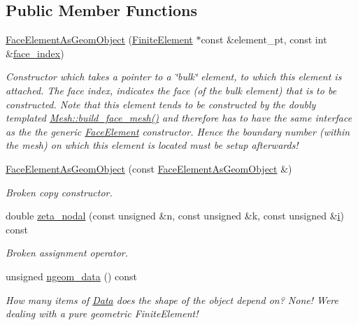 \subsection*{Public Member Functions}
\begin{DoxyCompactItemize}
\item 
\hyperlink{classoomph_1_1FaceElementAsGeomObject_ab93ac80cc645460ee51ba86823a883fe}{Face\+Element\+As\+Geom\+Object} (\hyperlink{classoomph_1_1FiniteElement}{Finite\+Element} $\ast$const \&element\+\_\+pt, const int \&\hyperlink{classoomph_1_1FaceElement_a478d577ac6db67ecc80f1f02ae3ab170}{face\+\_\+index})
\begin{DoxyCompactList}\small\item\em Constructor which takes a pointer to a \char`\"{}bulk\char`\"{} element, to which this element is attached. The face index, indicates the face (of the bulk element) that is to be constructed. Note that this element tends to be constructed by the doubly templated \hyperlink{classoomph_1_1Mesh_a93e1758501aeea3328291571ce501029}{Mesh\+::build\+\_\+face\+\_\+mesh()} and therefore has to have the same interface as the the generic \hyperlink{classoomph_1_1FaceElement}{Face\+Element} constructor. Hence the boundary number (within the mesh) on which this element is located must be setup afterwards! \end{DoxyCompactList}\item 
\hyperlink{classoomph_1_1FaceElementAsGeomObject_a86d211baa7a5bfa590c7467e863c6d07}{Face\+Element\+As\+Geom\+Object} (const \hyperlink{classoomph_1_1FaceElementAsGeomObject}{Face\+Element\+As\+Geom\+Object} \&)
\begin{DoxyCompactList}\small\item\em Broken copy constructor. \end{DoxyCompactList}\item 
double \hyperlink{classoomph_1_1FaceElementAsGeomObject_aa5971a8b6d24780bfc3c05be7a88852d}{zeta\+\_\+nodal} (const unsigned \&n, const unsigned \&k, const unsigned \&\hyperlink{cfortran_8h_adb50e893b86b3e55e751a42eab3cba82}{i}) const
\begin{DoxyCompactList}\small\item\em Broken assignment operator. \end{DoxyCompactList}\item 
unsigned \hyperlink{classoomph_1_1FaceElementAsGeomObject_aa4c65d845266c0fc60bbd0d75d2951bb}{ngeom\+\_\+data} () const
\begin{DoxyCompactList}\small\item\em How many items of \hyperlink{classoomph_1_1Data}{Data} does the shape of the object depend on? None! We\textquotesingle{}re dealing with a pure geometric Finite\+Element! \end{DoxyCompactList}\item 

\end{DoxyCompactItemize}
